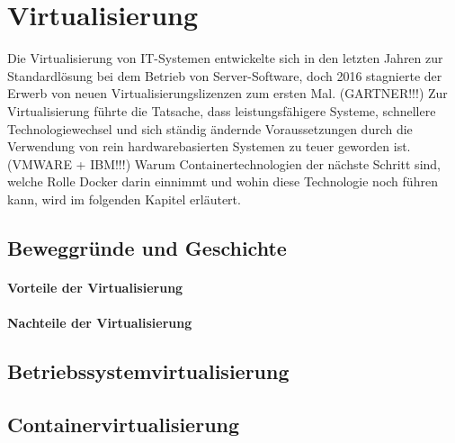 \chapter{Virtualisierung}
\label{cha:virtualisierung}
Die Virtualisierung von IT-Systemen entwickelte sich in den letzten Jahren zur Standardlösung bei dem Betrieb von Server-Software, doch 2016 stagnierte der Erwerb von neuen Virtualisierungslizenzen zum ersten Mal. (GARTNER!!!)
Zur Virtualisierung führte die Tatsache, dass leistungsfähigere Systeme, schnellere Technologiewechsel und sich ständig ändernde Voraussetzungen durch die Verwendung von rein hardwarebasierten Systemen zu teuer geworden ist. (VMWARE + IBM!!!)
Warum Containertechnologien der nächste Schritt sind, welche Rolle Docker darin einnimmt und wohin diese Technologie noch führen kann, wird im folgenden Kapitel erläutert.
\section{Beweggründe und Geschichte}
\label{sec:virtualisierungsgeschichte}
\subsubsection{Vorteile der Virtualisierung}
\subsubsection{Nachteile der Virtualisierung}
\section{Betriebssystemvirtualisierung}
\label{sec:betriebssystemvirtualisierung}
\section{Containervirtualisierung}
\label{sec:containervirtualisierung}
